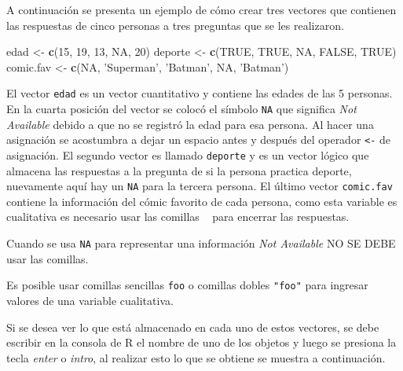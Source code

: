 \documentclass[10pt,]{krantz}
\makeatletter
\newenvironment{Shaded}{\begin{snugshade}}{\end{snugshade}}
\newcommand{\KeywordTok}[1]{\textcolor[rgb]{0.13,0.29,0.53}{\textbf{{#1}}}}
\newcommand{\DecValTok}[1]{\textcolor[rgb]{0.00,0.00,0.81}{{#1}}}
\newcommand{\StringTok}[1]{\textcolor[rgb]{0.31,0.60,0.02}{{#1}}}
\newcommand{\OtherTok}[1]{\textcolor[rgb]{0.56,0.35,0.01}{{#1}}}
\newcommand{\NormalTok}[1]{{#1}}
\let\proglang=\textsf
\newenvironment{kframe}{%
\medskip{}
\setlength{\fboxsep}{.8em}
 \def\at@end@of@kframe{}%
 \ifinner\ifhmode%
  \def\at@end@of@kframe{\end{minipage}}%
  \begin{minipage}{\columnwidth}%
 \fi\fi%
 \def\FrameCommand##1{\hskip\@totalleftmargin \hskip-\fboxsep
 \colorbox{shadecolor}{##1}\hskip-\fboxsep
     \hskip-\linewidth \hskip-\@totalleftmargin \hskip\columnwidth}%
 \MakeFramed {\advance\hsize-\width
   \@totalleftmargin\z@ \linewidth\hsize
   \@setminipage}}%
 {\par\unskip\endMakeFramed%
 \at@end@of@kframe}
\renewenvironment{Shaded}{\begin{kframe}}{\end{kframe}}
\let\BeginKnitrBlock\begin \let\EndKnitrBlock\end
\makeatother
\begin{document}
A continuación se presenta un ejemplo de cómo crear tres vectores que
contienen las respuestas de cinco personas a tres preguntas que se les
realizaron.

\begin{Shaded}
\begin{Highlighting}[]
\NormalTok{edad <-}\StringTok{ }\KeywordTok{c}\NormalTok{(}\DecValTok{15}\NormalTok{, }\DecValTok{19}\NormalTok{, }\DecValTok{13}\NormalTok{, }\OtherTok{NA}\NormalTok{, }\DecValTok{20}\NormalTok{)}
\NormalTok{deporte <-}\StringTok{ }\KeywordTok{c}\NormalTok{(}\OtherTok{TRUE}\NormalTok{, }\OtherTok{TRUE}\NormalTok{, }\OtherTok{NA}\NormalTok{, }\OtherTok{FALSE}\NormalTok{, }\OtherTok{TRUE}\NormalTok{)}
\NormalTok{comic.fav <-}\StringTok{ }\KeywordTok{c}\NormalTok{(}\OtherTok{NA}\NormalTok{, }\StringTok{'Superman'}\NormalTok{, }\StringTok{'Batman'}\NormalTok{, }\OtherTok{NA}\NormalTok{, }\StringTok{'Batman'}\NormalTok{)}
\end{Highlighting}
\end{Shaded}

El vector \texttt{edad} es un vector cuantitativo y contiene las edades
de las 5 personas. En la cuarta posición del vector se colocó el símbolo
\texttt{NA} que significa \textit{Not Available} debido a que no se
registró la edad para esa persona. Al hacer una asignación se acostumbra
a dejar un espacio antes y después del operador \texttt{\textless{}-} de
asignación. El segundo vector es llamado \texttt{deporte} y es un vector
lógico que almacena las respuestas a la pregunta de si la persona
practica deporte, nuevamente aquí hay un \texttt{NA} para la tercera
persona. El último vector \texttt{comic.fav} contiene la información del
cómic favorito de cada persona, como esta variable es cualitativa es
necesario usar las comillas
\texttt{\textquotesingle{}\ \textquotesingle{}} para encerrar las
respuestas.

\BeginKnitrBlock{rmdimportant}
Cuando se usa \texttt{NA} para representar una información
\textit{Not Available} NO SE DEBE usar las comillas.
\EndKnitrBlock{rmdimportant}

\BeginKnitrBlock{rmdimportant}
Es posible usar comillas sencillas
\texttt{\textquotesingle{}foo\textquotesingle{}} o comillas dobles
\texttt{"foo"} para ingresar valores de una variable cualitativa.
\EndKnitrBlock{rmdimportant}

Si se desea ver lo que está almacenado en cada uno de estos vectores, se
debe escribir en la consola de \proglang{R} el nombre de uno de los
objetos y luego se presiona la tecla \textit{enter} o \textit{intro}, al
realizar esto lo que se obtiene se muestra a continuación.
\end{document}
